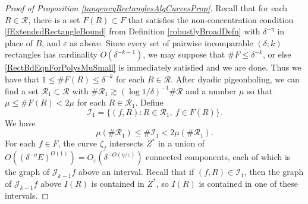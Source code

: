 \documentclass[letterpaper, reqno,11pt]{article}
\numberwithin{equation}{section}
\newcommand{\eps}{\varepsilon}
\numberwithin{thm}{section}
\theoremstyle{remark}
\begin{document}
\begin{proof}[Proof of Proposition \ref{tangencyRectanglesAlgCurvesProp}]
\medskip
{} 
Recall that for each $R\in\mathcal{R}$, there is a set $F(R)\subset F$ that satisfies the non-concentration condition \eqref{fExtendedRectangleBound} from Definition \ref{robustlyBroadDefn} with $\delta^{-\eta}$ in place of $B$, and $\eps$ as above. 
%
Since every set of pairwise incomparable $(\delta;k)$ rectangles has cardinality $O(\delta^{-k-1})$, we may suppose that $\#F\leq\delta^{-k}$, or else \eqref{RectBdEqnForPolysMuSmall} is immediately satisfied and we are done. Thus we have that $1\leq \# F(R)\leq \delta^{-k}$ for each $R\in\mathcal{R}$. After dyadic pigeonholing, we can find a set $\mathcal{R}_1\subset\mathcal{R}$ with $\#\mathcal{R}_1\gtrsim(\log1/\delta)^{-1}\#\mathcal{R}$ and a number $\mu$ so that $\mu\leq \#F(R)<2\mu$ for each $R\in\mathcal{R}_1$.  Define 
\[
\mathcal{I}_1 = \{ (f,R)\colon R\in\mathcal{R}_1,\ f\in F(R)\}.
\] 
We have
\begin{equation}\label{sizeOfI1}
\mu(\#\mathcal{R}_1)\leq \#\mathcal{I}_1 <2\mu(\#\mathcal{R}_1).
\end{equation}
For each $f\in F$, the curve $\zeta_f$ intersects $Z^*$ in a union of $O( (\delta^{-\eta}E)^{O(1)}) =O_\eps(\delta^{-O(\eta/\eps)})$ connected components, each of which is the graph of $\mathcal{J}_{k-1}f$ above an interval. Recall that if $(f,R)\in \mathcal{I}_1$, then the graph of $\mathcal{J}_{k-1}f$ above $I(R)$ is contained in $Z^*$, so $I(R)$ is contained in one of these intervals. 


\end{proof}
\end{document}
